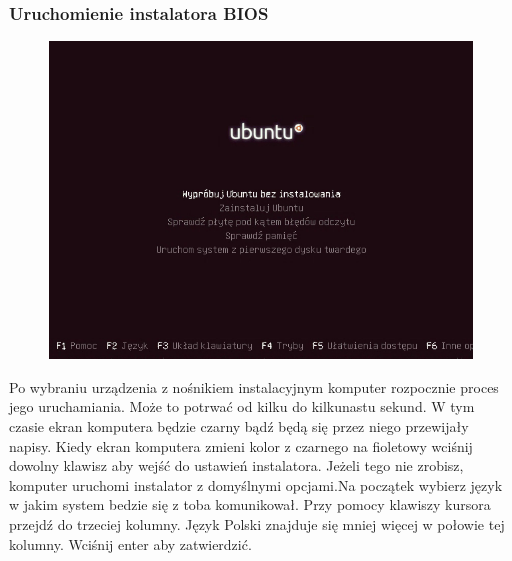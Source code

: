\subsubsection{Uruchomienie instalatora BIOS}
\label{instalacja_uruchomienie}
\begin{figure}
		\includegraphics[scale=0.5]{images/instalacja_BIOS_boot.png}
\end{figure}
Po wybraniu urządzenia z nośnikiem instalacyjnym komputer rozpocznie proces jego uruchamiania. Może to potrwać od kilku do kilkunastu sekund. W tym czasie ekran komputera będzie czarny bądź będą się przez niego przewijały napisy. Kiedy ekran komputera zmieni kolor z czarnego na fioletowy wciśnij dowolny klawisz aby wejść do ustawień instalatora. Jeżeli tego nie zrobisz, komputer uruchomi instalator z domyślnymi opcjami.Na początek wybierz język w jakim system bedzie się z toba komunikował. Przy pomocy klawiszy kursora przejdź do trzeciej kolumny. Język Polski  znajduje się mniej więcej w połowie tej kolumny. Wciśnij enter aby zatwierdzić.
\clearpage
